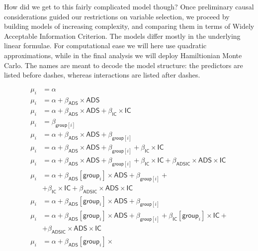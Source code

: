 \documentclass[10pt,dvipsnames,enabledeprecatedfontcommands]{scrartcl}
\begin{document}
How did we get to this fairly complicated model though? Once preliminary
causal considerations guided our restrictions on variable selection, we
proceed by building models of increasing complexity, and comparing them
in terms of Widely Acceptable Information Criterion. The models differ
mostly in the underlying linear formulae. For computational ease we will
here use quadratic approximations, while in the final analysis we will
deploy Hamiltionian Monte Carlo. The names are meant to decode the model
structure: the predictors are listed before dashes, whereas interactions
are listed after dashes.

\begin{align}
\tag{Null}  \mu_i & = \alpha\\
\tag{ADS}  \mu_i & = \alpha + \beta_{\mathsf{ADS}}\times \mathsf{ADS}\\
\tag{ADSIC}  \mu_i & = \alpha + \beta_{\mathsf{ADS}}\times \mathsf{ADS} +    \beta_{\mathsf{IC}}\times \mathsf{IC}\\
\tag{IT}  \mu_i & = \beta_{\mathsf{group}[i]} \\
\tag{ADSIT} \mu_i & = \alpha + \beta_{\mathsf{ADS}}\times \mathsf{ADS} +  \beta_{\mathsf{group}[i]}\\
\tag{ADSITIC} \mu_i & = \alpha + \beta_{\mathsf{ADS}}\times \mathsf{ADS} +  \beta_{\mathsf{group}[i]} +    \beta_{\mathsf{IC}}\times \mathsf{IC}\\
\tag{ADSITIC-ADSIC} \mu_i & = \alpha + \beta_{\mathsf{ADS}}\times \mathsf{ADS} +  \beta_{\mathsf{group}[i]} +    \beta_{\mathsf{IC}}\times \mathsf{IC} + \beta_{\mathsf{ADSIC}}\times \mathsf{ADS} \times \mathsf{IC}\\
\tag{ADSITIC-ADSIC-ADSIT} \mu_i & = \alpha + \beta_{\mathsf{ADS}}[\mathsf{group}_i]\times \mathsf{ADS} +  \beta_{\mathsf{group}[i]} +  \\ \nonumber & +  \beta_{\mathsf{IC}}\times \mathsf{IC} + \beta_{\mathsf{ADSIC}}\times \mathsf{ADS} \times \mathsf{IC}\\
\tag{ADSIT-ADSIT}   \mu_i &  = \alpha + \beta_{\mathsf{ADS}}[\mathsf{group}_i] \times
 \mathsf{ADS} + \beta_{\mathsf{group}[i]} \\
\tag{ADSITIC-ADSIT-ITIC-ADSIC}   \mu_i &  = \alpha  +  \beta_{\mathsf{ADS}}[\mathsf{group}_i] \times \mathsf{ADS} + \beta_{\mathsf{group}[i]} +  
\beta_{\mathsf{IC}}[\mathsf{group}_i] \times \mathsf{IC} + \\ \nonumber & + \beta_{\mathsf{ADSIC}}\times \mathsf{ADS} \times \mathsf{IC}\\
\tag{ADSITICCBS-ITIC-ADSIC} \mu_i &  = \alpha  +  \beta_{\mathsf{ADS}}[\mathsf{group}_i] \times

\end{align}
\end{document}
